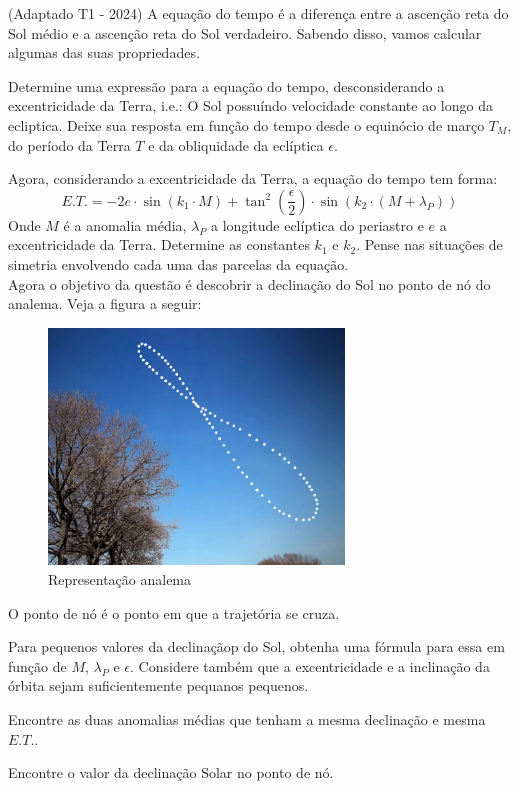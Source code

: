 \documentclass[11pt]{article}
\begin{document}
    \begin{pproblem} (Adaptado T1 - 2024)
        A equação do tempo é a diferença entre a ascenção reta do Sol médio e a ascenção reta do Sol verdadeiro. Sabendo disso, vamos calcular algumas das suas propriedades.
        \begin{alternativas}
            \item Determine uma expressão para a equação do tempo, desconsiderando a excentricidade da Terra, i.e.: O Sol possuíndo velocidade constante ao longo da ecliptica. Deixe sua resposta em função do tempo desde o equinócio de março \(T_M\), do período da Terra \(T\) e da obliquidade da eclíptica \(\epsilon\).
            \item Agora, considerando a excentricidade da Terra, a equação do tempo tem forma:
            \[E.T. = -2e \cdot \sin(k_1 \cdot M) + \tan^2 \left( \frac{\epsilon}{2} \right) \cdot \sin\left( k_2 \cdot (M + \lambda_P) \right)\]
            Onde \(M\) é a anomalia média, \(\lambda_P\) a longitude eclíptica do periastro e \(e\) a excentricidade da Terra. Determine as constantes \(k_1\) e \(k_2\). Pense nas situações de simetria envolvendo cada uma das parcelas da equação.
            \\
            Agora o objetivo da questão é descobrir a declinação do Sol no ponto de nó do analema. Veja a figura a seguir:
            \begin{figure}[H]
                \centering
                \includegraphics[width=0.7\textwidth]{imagens/q16.png}
                \caption{Representação analema}
            \end{figure}
            O ponto de nó é o ponto em que a trajetória se cruza.
            \item Para pequenos valores da declinaçãop do Sol, obtenha uma fórmula para essa em função de \(M\), \(\lambda_P\) e \(\epsilon\). Considere também que a excentricidade e a inclinação da órbita sejam suficientemente pequanos pequenos.
            \item Encontre as duas anomalias médias que tenham a mesma declinação e mesma \(E.T.\).
            \item Encontre o valor da declinação Solar no ponto de nó.
        \end{alternativas}
    

\end{pproblem}
\end{document}
